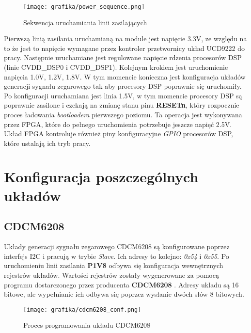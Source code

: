  \begin{figure}[!ht]
\centering
\texttt{[image: grafika/power\_sequence.png]}
\caption{Sekwencja uruchamiania linii zasilających}
\end{figure}

 
Pierwszą linią zasilania uruchamianą na module jest napięcie 3.3V, ze względu na to że jest to napięcie wymagane przez kontroler przetwornicy układ UCD9222 do pracy. Następnie uruchamiane jest regulowane napięcie rdzenia procesorów DSP (linie CVDD\_DSP0 i CVDD\_DSP1). Kolejnym krokiem jest uruchomienie napięcia 1.0V, 1.2V, 1.8V.  W tym momencie konieczna jest konfiguracja układów generacji sygnału zegarowego tak aby procesory DSP poprawnie się uruchomiły. Po konfiguracji uruchamiana jest linia 1.5V, w tym momencie procesory DSP są poprawnie zasilone i czekają na zmianę stanu pinu \textbf{RESETn}, który rozpocznie proces ładowania \textit{bootloadera} pierwszego poziomu. Ta operacja jest wykonywana przez FPGA, które do pełnego uruchomienia potrzebuje jeszcze napięć 2.5V.  Układ FPGA kontroluje również piny konfiguracyjne \textit{GPIO} procesorów DSP, które ustalają ich tryb pracy. 

\section{Konfiguracja poszczególnych układów}

\subsection{CDCM6208}
Układy generacji sygnału zegarowego CDCM6208 są konfigurowane poprzez interfejs I2C i pracują w trybie \textit{Slave}. Ich adresy to kolejno: \textit{0x54} i \textit{0x55}. Po uruchomieniu linii zasilania \textbf{P1V8} odbywa się konfiguracja wewnętrznych rejestrów układów. Wartości rejestrów zostały wygenerowane za pomocą programu dostarczonego przez producenta \textbf{CDCM6208} \cite{CDCM6208:INFO2}.  Adresy ukladu są 16 bitowe, ale wypełnianie ich odbywa się poprzez wysłanie dwóch słów 8 bitowych.


 \begin{figure}[!ht]
\centering
\texttt{[image: grafika/cdcm6208\_conf.png]}
\caption{Proces programowania układu CDCM6208}
\end{figure}


